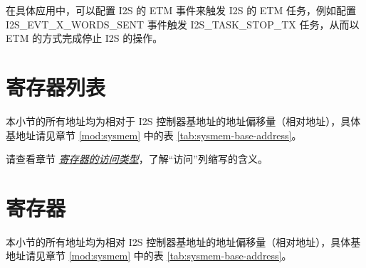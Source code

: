 \documentclass[main\_\_CN.tex]{subfiles}
\begin{document}
在具体应用中，可以配置 I2S 的 ETM 事件来触发 I2S 的 ETM 任务，例如配置 I2S\_EVT\_X\_WORDS\_SENT 事件触发 I2S\_TASK\_STOP\_TX 任务，从而以 ETM 的方式完成停止 I2S 的操作。





\clearpage
\hypertarget{i2s-reg-summ}{}
\section{寄存器列表}
\label{sec:i2s-reg-summ}

本小节的所有地址均为相对于 I2S 控制器基地址的地址偏移量（相对地址），具体基地址请见章节 \ref{mod:sysmem} \textit{} 中的表 \ref{tab:sysmem-base-address}。

请查看章节 \hyperref[glossary-access-types]{\textit{寄存器的访问类型}}，了解“访问”列缩写的含义。






\clearpage
\section{寄存器}

本小节的所有地址均为相对 I2S 控制器基地址的地址偏移量（相对地址），具体基地址请见章节 \ref{mod:sysmem} \textit{} 中的表 \ref{tab:sysmem-base-address}。


\end{document}
